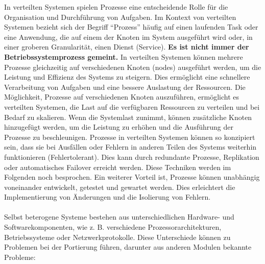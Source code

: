 \documentclass[../vs-script-first-v01.tex]{subfiles}
\begin{document}
In verteilten Systemen spielen Prozesse eine entscheidende Rolle für die Organisation und Durchführung von Aufgaben. Im Kontext von verteilten Systemen bezieht sich der Begriff \enquote{Prozess} häufig auf einen laufenden Task oder eine Anwendung, die auf einem der Knoten im System ausgeführt wird oder, in einer groberen Granularität, einen Dienst (Service). \textbf{Es ist nicht immer der Betriebssystemprozess gemeint.} In verteilten Systemen können mehrere Prozesse gleichzeitig auf verschiedenen Knoten (nodes) ausgeführt werden, um die Leistung und Effizienz des Systems zu steigern. Dies ermöglicht eine schnellere Verarbeitung von Aufgaben und eine bessere Auslastung der Ressourcen. 
Die Möglichkeit, Prozesse auf verschiedenen Knoten auszuführen, ermöglicht es verteilten Systemen, die Last auf die verfügbaren Ressourcen zu verteilen und bei Bedarf zu skalieren. Wenn die Systemlast zunimmt, können zusätzliche Knoten hinzugefügt werden, um die Leistung zu erhöhen und die Ausführung der Prozesse zu beschleunigen. Prozesse in verteilten Systemen können so konzipiert sein, dass sie bei Ausfällen oder Fehlern in anderen Teilen des Systems weiterhin funktionieren (Fehlertolerant). Dies kann durch redundante Prozesse, Replikation oder automatisches Failover erreicht werden. Diese Techniken werden im Folgenden noch besprochen. Ein weiterer Vorteil ist, Prozesse können unabhängig voneinander entwickelt, getestet und gewartet werden. Dies erleichtert die Implementierung von Änderungen und die Isolierung von Fehlern. \\\\
Selbst beterogene Systeme bestehen aus unterschiedlichen Hardware- und Softwarekomponenten, wie z. B. verschiedene Prozessorarchitekturen, Betriebssysteme oder Netzwerkprotokolle. Diese Unterschiede können zu Problemen bei der Portierung führen, darunter aus anderen Modulen bekannte Probleme:
\end{document}

